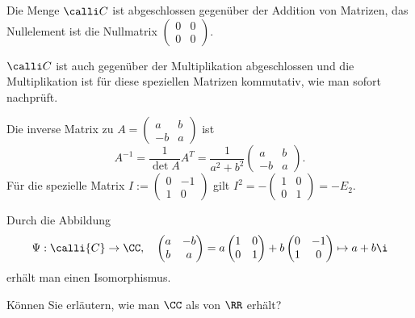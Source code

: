 \begin{antwort}
Die Menge $\calli C$ ist abgeschlossen gegenüber der Addition von Matrizen, 
das Nullelement ist die Nullmatrix $\begin{pmatrix} 0 &0 \\ 0 &0\end{pmatrix}$. 

$\calli C$ ist auch gegenüber der Multiplikation abgeschlossen und die Multiplikation 
ist für diese speziellen Matrizen kommutativ, wie man sofort nachprüft.

Die inverse Matrix zu 
$A=\begin{pmatrix} a & b \\ -b & a \end{pmatrix}$ ist 
\[
A^{-1} = \frac{1}{\det A} A^T = \frac{1}{a^2+b^2} 
\begin{pmatrix} a & b \\ -b & a \end{pmatrix}.
\]
Für die spezielle Matrix $I:=\begin{pmatrix} 0 & -1 \\ 1 & 0 \end{pmatrix}$ 
gilt $I^2 = - \begin{pmatrix} 1 & 0 \\ 0 & 1 \end{pmatrix} = -E_2$.

Durch die Abbildung 
\[
\Psi: \calli{C} \to \CC, 
\quad
\begin{pmatrix} 
a &-b \\ b & a
\end{pmatrix}
= 
a \begin{pmatrix} 
1&0 \\ 0&1
\end{pmatrix}
+ b \begin{pmatrix} 
0 & -1 \\ 1 & 0 
\end{pmatrix}
\mapsto a+b\i
\]
erhält man einen Isomorphismus.\AntEnd
\end{antwort}


\begin{frage}
Können Sie erläutern, wie man $\CC$ als  
von $\RR$ erhält?
\end{frage}

